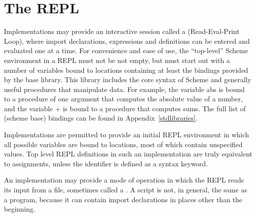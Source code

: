 \section{The REPL}

Implementations may provide an interactive session called a
 (Read-Eval-Print Loop), where import declarations,
expressions and definitions can be
entered and evaluated one at a time.  For convenience and ease of use,
the ``top-level'' Scheme environment in a REPL
must not be not empty, but must start out with a number of variables
bound to locations containing at least the bindings provided by the
base library.  This library includes the core syntax of Scheme
and generally useful procedures that manipulate data.  For example, the
variable {\cf abs} is bound to a
procedure of one argument that computes the absolute value of a
number, and the variable {\cf +} is bound to a procedure that computes
sums.  The full list of {\cf(scheme base)} bindings can be found in
Appendix~\ref{stdlibraries}.

Implementations are permitted to provide an initial REPL environment in
which all possible variables are bound to locations, most of
which contain unspecified values.  Top level REPL definitions in
such an implementation are truly equivalent to assignments,
unless the identifier is defined as a syntax keyword.

An implementation may provide a mode of operation in which the REPL
reads its input from a file, sometimes called a .  A script is not, in general, the same
as a program, because it can contain import declarations in places other than
the beginning.

